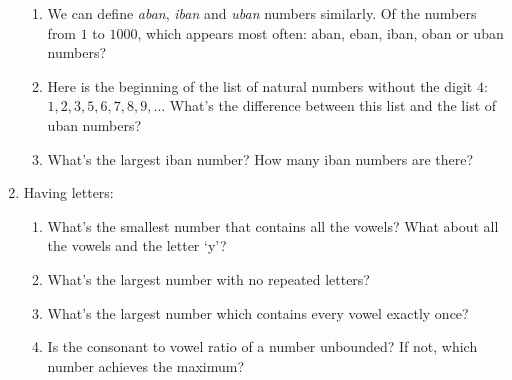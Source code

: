 \documentclass[11pt,paper=letter]{scrartcl}
\begin{document}
\begin{enumerate}
\begin{enumerate}
    \item We can define \emph{aban}, \emph{iban} and \emph{uban} numbers similarly. Of the numbers from $1$ to $1000$, which appears most often: aban, eban, iban, oban or uban numbers?
    \item Here is the beginning of the list of natural numbers without the digit $4$: $1, 2, 3, 5, 6, 7, 8, 9, \ldots$ What's the difference between this list and the list of uban numbers?
    \item What's the largest iban number? How many iban numbers are there?
  \end{enumerate}
  \item Having letters:
  \begin{enumerate}
    \item What's the smallest number that contains all the vowels? What about all the vowels and the letter `y'?
    \item What's the largest number with no repeated letters?
    \item What's the largest number which contains every vowel exactly once?
    \item Is the consonant to vowel ratio of a number unbounded? If not, which number achieves the maximum?
  \end{enumerate}
\end{enumerate}
\end{document}
